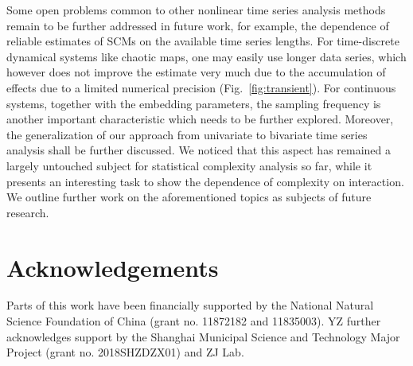 \documentclass[12pt,aip,cha,reprint,nofootinbib]{revtex4-1}
\begin{document}
Some open problems common to other nonlinear time series analysis methods remain to be further addressed in future work, for example, the dependence of reliable estimates of SCMs on the available time series lengths. For time-discrete dynamical systems like chaotic maps, one may easily use longer data series, which however does not improve the estimate very much due to the accumulation of effects due to a limited numerical precision (Fig.~\ref{fig:transient}). For continuous systems, together with the embedding parameters, the sampling frequency is another important characteristic which needs to be further explored. Moreover, the generalization of our approach from univariate to bivariate time series analysis shall be further discussed. We noticed that this aspect has remained a largely untouched subject for statistical complexity analysis so far, while it presents an interesting task to show the dependence of complexity on interaction. 
We outline further work on the aforementioned topics as subjects of future research.

\section*{Acknowledgements}
Parts of this work have been financially supported by the National Natural Science Foundation of China (grant no. 11872182 and 11835003). YZ further acknowledges support by the Shanghai Municipal Science and Technology Major Project (grant no. 2018SHZDZX01) and ZJ Lab. 



\end{document}
